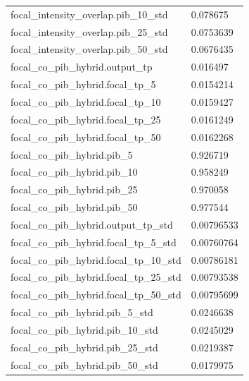 \begin{longtable}{p{}p{}}
focal\_intensity\_overlap.pib\_10\_std & 0.078675\\
focal\_intensity\_overlap.pib\_25\_std & 0.0753639\\
focal\_intensity\_overlap.pib\_50\_std & 0.0676435\\
focal\_co\_pib\_hybrid.output\_tp & 0.016497\\
focal\_co\_pib\_hybrid.focal\_tp\_5 & 0.0154214\\
focal\_co\_pib\_hybrid.focal\_tp\_10 & 0.0159427\\
focal\_co\_pib\_hybrid.focal\_tp\_25 & 0.0161249\\
focal\_co\_pib\_hybrid.focal\_tp\_50 & 0.0162268\\
focal\_co\_pib\_hybrid.pib\_5 & 0.926719\\
focal\_co\_pib\_hybrid.pib\_10 & 0.958249\\
focal\_co\_pib\_hybrid.pib\_25 & 0.970058\\
focal\_co\_pib\_hybrid.pib\_50 & 0.977544\\
focal\_co\_pib\_hybrid.output\_tp\_std & 0.00796533\\
focal\_co\_pib\_hybrid.focal\_tp\_5\_std & 0.00760764\\
focal\_co\_pib\_hybrid.focal\_tp\_10\_std & 0.00786181\\
focal\_co\_pib\_hybrid.focal\_tp\_25\_std & 0.00793538\\
focal\_co\_pib\_hybrid.focal\_tp\_50\_std & 0.00795699\\
focal\_co\_pib\_hybrid.pib\_5\_std & 0.0246638\\
focal\_co\_pib\_hybrid.pib\_10\_std & 0.0245029\\
focal\_co\_pib\_hybrid.pib\_25\_std & 0.0219387\\
focal\_co\_pib\_hybrid.pib\_50\_std & 0.0179975\\
\end{longtable}

